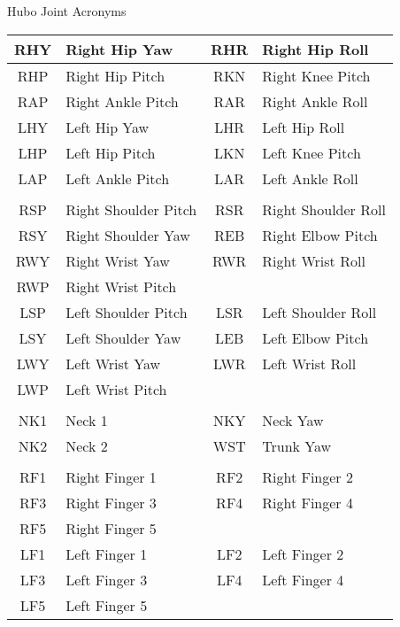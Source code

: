 \Large
\centering
Hubo Joint Acronyms\\
\normalsize
\begin{tabular}{c | l || c | l}
\hline
		RHY				&	Right Hip Yaw     & RHR				&	Right Hip Roll \\
		\hline
		RHP				&	Right Hip Pitch   & RKN				&	Right Knee Pitch\\
		\hline
		RAP				&	Right Ankle Pitch & RAR				&	Right Ankle Roll\\
\hline

\hline
		LHY				&	Left Hip Yaw      & LHR				&	Left Hip Roll\\
		\hline
		LHP				&	Left Hip Pitch    & LKN				&	Left Knee Pitch\\
		\hline
		LAP				&	Left Ankle Pitch  & LAR				&	Left Ankle Roll\\
\hline
& & & \\
\hline
		RSP				&	Right Shoulder Pitch & RSR			&	Right Shoulder Roll\\
		\hline
		RSY				&	Right Shoulder Yaw   & REB			&	Right Elbow Pitch\\
		\hline
		RWY				&   Right Wrist Yaw      & RWR			&   Right Wrist Roll\\
		\hline
		RWP				&   Right Wrist Pitch    & & \\
\hline

\hline
		LSP				&	Left Shoulder Pitch  & LSR		    &	Left Shoulder Roll\\
		\hline
		LSY				&	Left Shoulder Yaw    & LEB			&	Left Elbow Pitch\\
		\hline
		LWY				&   Left Wrist Yaw       & LWR			&   Left Wrist Roll\\
		\hline
		LWP				&   Left Wrist Pitch	 & & \\
\hline
& & & \\
\hline
		NK1				& Neck 1    & NKY				& Neck Yaw\\
		\hline
	    NK2				& Neck 2    & WST				& Trunk Yaw \\
\hline

		  & & \\
\hline
		RF1				&	Right Finger 1 & RF2				&	Right Finger 2\\
		\hline
		RF3				&	Right Finger 3 & RF4				&	Right Finger 4\\
		\hline
		RF5				&	Right Finger 5 & & \\
\hline

\hline
		LF1				&	Left Finger 1 & LF2				&	Left Finger 2\\
		\hline
		LF3				&	Left Finger 3 & LF4				&	Left Finger 4\\
		\hline
		LF5				&	Left Finger 5 & & \\
		
\end{tabular}